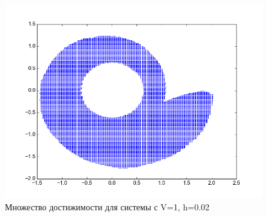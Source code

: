 \begin{figure}[h]
\centering
  \noindent \hfil
  \includegraphics[width=1\linewidth]{img/figure_d_h_001_ht_01}
  \hfil \caption{Множество достижимости для системы с V=1, h=0.02}
  \label{fig:v1h0.02}
\end{figure}


